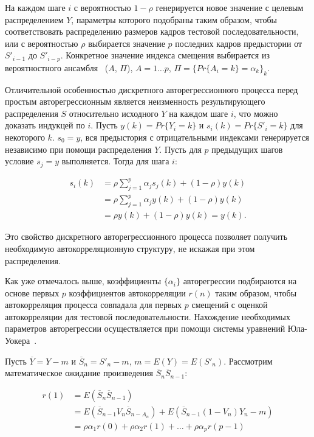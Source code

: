 На каждом шаге $i$ с вероятностью $1 - \rho$ генерируется новое значение с целевым
распределением $Y$, параметры которого подобраны таким образом, чтобы
соответствовать распределению размеров кадров тестовой последовательности,
или с вероятностью $\rho$ выбирается значение $p$ последних кадров предыстории
от $S'_{i-1}$ до $S'_{i-p}$. Конкретное значение индекса смещения выбирается
из вероятностного ансамбля~\cite{shannon} ($A$, $\Pi$), $A = {1 \dots p}$,
$\Pi = \{Pr\{A_i = k\} = \alpha_k\}_k$.

Отличительной особенностью дискретного авторегрессионного процесса
перед простым авторегрессионным является неизменность результирующего
распределения $S$ относительно исходного $Y$ на каждом шаге $i$, что можно доказать индукцей по $i$.
Пусть $y(k) = Pr\{Y_i = k\}$ и $s_i(k) = Pr\{S'_i = k\}$ для некоторого $k$.
$s_0 = y$, вся предыстория с отрицательными индексами генерируется
независимо при помощи распределения $Y$. Пусть для $p$ предыдущих шагов
условие $s_{j} = y$ выполняется. Тогда для шага $i$:

\begin{equation}
    \begin{aligned}
        s_i(k) &= \rho \sum_{j=1}^p \alpha_j s_j(k) + (1 - \rho)y(k) \\
               &= \rho \sum_{j=1}^p \alpha_j y(k) + (1 - \rho)y(k) \\
               &= \rho y(k) + (1 - \rho)y(k) = y(k).
    \end{aligned}
\end{equation}

Это свойство дискретного авторегрессионного процесса позволяет получить
необходимую автокорреляционную структуру, не искажая при этом
распределения.

Как уже отмечалось выше, коэффициенты $\{\alpha_i\}$ авторегрессии
подбираются на основе первых $p$ коэффициентов автокорреляции $r(n)$  таким
образом, чтобы автокорреляция процесса совпадала для первых $p$ смещений
с оценкой автокорреляции для тестовой последовательности. Нахождение
необходимых параметров авторегрессии осуществляется при помощи системы
уравнений Юла-Уокера~\cite{mixtures}.

Пусть $\overline{Y} = Y - m$ и $\overline{S}_n = S'_n - m$, $m = E(Y) = E(S'_n)$.
Рассмотрим математическое ожидание произведения $\overline{S}_n\overline{S}_{n-1}$:

\begin{equation}
    \begin{aligned}
        r(1) &= E(\overline{S}_n \overline{S}_{n-1}) \\
             &= E(\overline{S}_{n-1} V_n \overline{S}_{n - A_n}) + E(\overline{S}_{n-1} (1 - V_n) Y_n - m) \\
             &= \rho\alpha_1 r(0) + \rho\alpha_2 r(1) + \dots + \rho\alpha_p r(p - 1) \\
    \end{aligned}
\end{equation}


